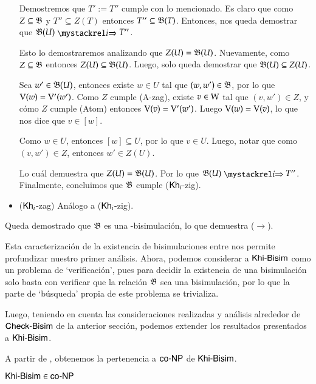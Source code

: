 \begin{demostracion}
\begin{itemize}
        Demostremos que $T' := T''$ cumple con lo mencionado. Es claro que como $Z \subseteq \mathfrak{B}$ y 
        $T'' \subseteq Z(T)$ entonces $T'' \subseteq \mathfrak{B}(T)$. Entonces, nos queda demostrar que $\universalbis(U) \ultsExecAgi T''$.
    
        Esto lo demostraremos analizando que $Z(U) = \mathfrak{B}(U)$. Nuevamente, como $Z \subseteq \mathfrak{B}$
        entonces $Z(U) \subseteq \mathfrak{B}(U)$. Luego, solo queda demostrar que $\mathfrak{B}(U) \subseteq Z(U)$.
    
        Sea $w' \in \mathfrak{B}(U)$, entonces existe $w \in U$ tal que $(w,w') \in \mathfrak{B}$, por lo que $\mathrm{V}(w) = \mathrm{V}'(w')$. 
        Como $Z$ cumple (A-zag), existe $v \in \mathrm{W}$ tal que $(v,w') \in Z$, y cómo $Z$ cumple 
        (Atom) entonces $\mathrm{V}(v) = \mathrm{V}'(w')$. Luego $\mathrm{V}(w) = \mathrm{V}(v)$, lo que nos dice que $v \in [w]$.
    
        Como $w \in U$, entonces $[w] \subseteq U$, por lo que $v \in U$. Luego, notar que como $(v,w') \in Z$, entonces
        $w' \in Z(U)$.
    
        Lo cuál demuestra que $Z(U) = \mathfrak{B}(U)$. Por lo que $\universalbis(U) \ultsExecAgi T''$. Finalmente, concluimos 
        que $\mathfrak{B}$ cumple ($\mathsf{Kh}_i$-zig).
    
    
        \item ($\mathsf{Kh}_i$-zag) Análogo a ($\mathsf{Kh}_i$-zig).
    \end{itemize}
    Queda demostrado que $\mathfrak{B}$ es una \KHilogic-bisimulación, lo que demuestra ($\rightarrow$).
\end{demostracion}

Esta caracterización de la existencia de bisimulaciones entre \ultss
nos permite profundizar nuestro primer análisis. Ahora, podemos considerar a $\rm\textsf{Khi-Bisim}$ como un problema de `verificación', 
pues para decidir la existencia de una bisimulación solo basta con verificar que la relación $\mathfrak{B}$ sea una bisimulación, por lo 
que la parte de `búsqueda' propia de este problema se trivializa.

Luego, teniendo en cuenta las consideraciones realizadas y análisis alrededor de $\rm\textsf{Check-Bisim}$ de la anterior sección, podemos extender los 
resultados presentados a $\rm\textsf{Khi-Bisim}$.

A partir de , obtenemos la pertenencia a $\rm\textsf{co-NP}$ de $\rm\textsf{Khi-Bisim}$.

\begin{lema}\label{lema:khibisim-in-conp}
    $\rm\textsf{Khi-Bisim} \in \rm\textsf{co-NP}$ 
\end{lema}

